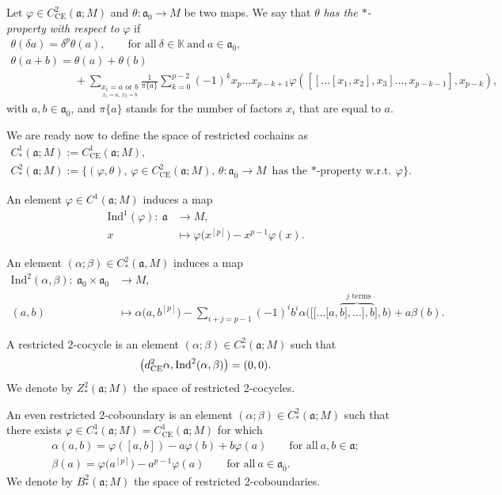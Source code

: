 \documentclass[pdftex]{sigma}
\numberwithin{equation}{section}
\begin{document}
Let $\varphi\in C^2_{\text{CE}}(\mathfrak{a};M)$ and $\theta\colon \mathfrak{a}_0\rightarrow M$ be two maps.
	We say that $\theta$ \textit{has the $*$-property with respect to} $\varphi$ if
\begin{gather*}
		\theta(\delta a)=\delta^p\theta(a),\qquad \text{for all}\ \delta\in \mathbb K \ \text{and}\ a\in \mathfrak{a}_{\bar 0},\\
		\theta(a+b)=\theta(a)+\theta(b)\\
\phantom{\theta(a+b)=}{}+ \sum_{\underset{x_1=a,~x_2=b}{x_i=a \text{ or } b}} \frac{1}{\pi\{a\}}\sum_{k=0}^{p-2}(-1)^kx_p\dots x_{p-k+1}\varphi([[\dots [x_1,x_2],x_3]\dots ,x_{p-k-1}],x_{p-k}),
\end{gather*}
with $a,b\in \mathfrak{a}_{\bar 0}$, and $\pi\{a\}$ stands for the number of factors $x_i$ that are equal to $a$.

We are ready now to define the space of restricted cochains as
\begin{gather*}
C^1_*(\mathfrak{a};M) := C^1_{\text{CE}}(\mathfrak{a};M),\\
C^2_*(\mathfrak{a};M) := \big\lbrace (\varphi,\theta),\, \varphi\in C^2_{\text{CE}}(\mathfrak{a};M),\,\theta\colon \mathfrak{a}_{{\bar 0}}\rightarrow M \text{ has the $*$-property w.r.t.} \ \varphi \big\rbrace.
\end{gather*}

An element $\varphi \in C^1(\mathfrak{a}; M)$ induces a map
\begin{align*}
\mathrm{Ind}^1(\varphi)\colon\ \mathfrak{a} &\longrightarrow M,\\
x&\longmapsto \varphi\bigl(x^{[p]}\bigr)-x^{p-1}\varphi(x).
\end{align*}

An element $(\alpha;\beta)\in C_*^2(\mathfrak{a},M)$ induces a map
\begin{align*}
	\mathrm{Ind}^2(\alpha,\beta)\colon\ \mathfrak{a}_0 \times \mathfrak{a}_0 & \longrightarrow M, \\
	(a,b)&\longmapsto \alpha\bigl( a,b^{[p]}\bigr) - \sum_{i+j=p-1}(-1)^ib^i \alpha\bigl( [[\dots [a,\overset{j\text{ terms}}{\overbrace{b],\dots ],b}]},b\bigr)+a\beta(b).
	\end{align*}

A restricted $2$-cocycle is an element $(\alpha;\beta)\in C_*^2(\mathfrak{a};M)$ such that
\[
\bigl(d_{\rm CE}^2\alpha,\mathrm{Ind}^2(\alpha,\beta)\bigr)=(0,0).
\]
We denote by $Z_*^2(\mathfrak{a};M)$ the space of restricted 2-cocycles.

An even restricted $2$-coboundary is an element $(\alpha; \beta)\in C_*^2(\mathfrak{a};M)$ such that there exists $\varphi\in C_*^1(\mathfrak{a}; M)=C_{\text{CE}}^1(\mathfrak{a}; M)$ for which
\begin{gather*}
\alpha(a,b) = \varphi([a,b])-a\varphi(b)+b\varphi(a) \qquad \text{for all}\ a,b\in \mathfrak{a}; \\
\beta(a) = \varphi\bigl(a^{[p]}\bigr)-a^{p-1}\varphi(a) \qquad \text{for all} \ a\in \mathfrak{a}_{\bar 0}.
\end{gather*}
We denote by $B_*^2(\mathfrak{a};M)$ the space of restricted 2-coboundaries.
\end{document}

